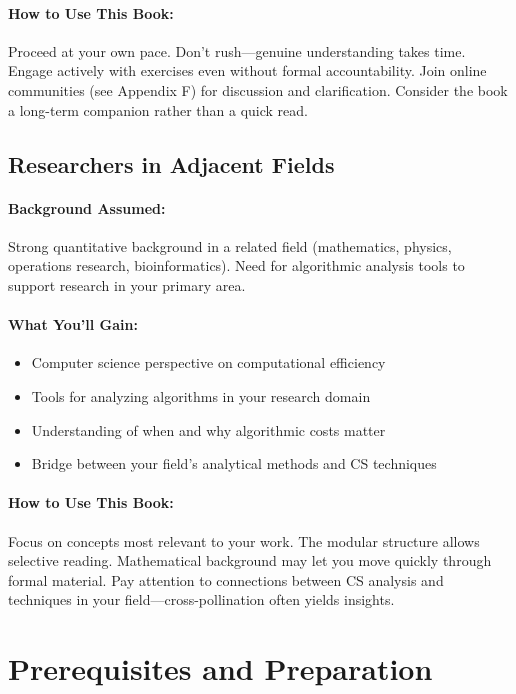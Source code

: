\paragraph{How to Use This Book:}
Proceed at your own pace. Don't rush—genuine understanding takes time. Engage actively with exercises even without formal accountability. Join online communities (see Appendix F) for discussion and clarification. Consider the book a long-term companion rather than a quick read.

\subsection{Researchers in Adjacent Fields}

\paragraph{Background Assumed:}
Strong quantitative background in a related field (mathematics, physics, operations research, bioinformatics). Need for algorithmic analysis tools to support research in your primary area.

\paragraph{What You'll Gain:}
\begin{itemize}
    \item Computer science perspective on computational efficiency
    \item Tools for analyzing algorithms in your research domain
    \item Understanding of when and why algorithmic costs matter
    \item Bridge between your field's analytical methods and CS techniques
\end{itemize}

\paragraph{How to Use This Book:}
Focus on concepts most relevant to your work. The modular structure allows selective reading. Mathematical background may let you move quickly through formal material. Pay attention to connections between CS analysis and techniques in your field—cross-pollination often yields insights.

\section{Prerequisites and Preparation}

